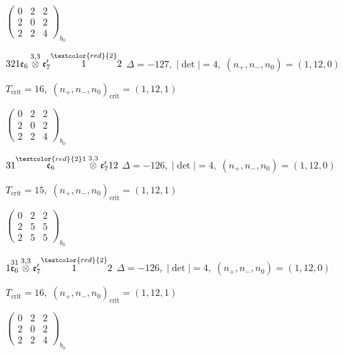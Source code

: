 \documentclass[10pt]{article}
\begin{document}
\hspace{2em}$\left(\begin{smallmatrix}0 & 2 & 2 \\ 2 & 0 & 2 \\ 2 & 2 & 4\end{smallmatrix}\right)_{\!b_0}$

\smallskip

$321\mathfrak{e}_6\overset{3,3}{\otimes}\mathfrak{e}_7'\overset{\textcolor{red}{2}}{1}2$ \quad $\Delta=-127,\; |\det|=4,\; (n_+,n_-,n_0)=(1,12,0)$

\hspace{1em}$T_{\text{crit}}=16,\; (n_+,n_-,n_0)_{\text{crit}}=(1,12,1)$

\hspace{2em}$\left(\begin{smallmatrix}0 & 2 & 2 \\ 2 & 0 & 2 \\ 2 & 2 & 4\end{smallmatrix}\right)_{\!b_0}$

\smallskip

$31\overset{\textcolor{red}{2}1}{\mathfrak{e}_6}\overset{3,3}{\otimes}\mathfrak{e}_7'12$ \quad $\Delta=-126,\; |\det|=4,\; (n_+,n_-,n_0)=(1,12,0)$

\hspace{1em}$T_{\text{crit}}=15,\; (n_+,n_-,n_0)_{\text{crit}}=(1,12,1)$

\hspace{2em}$\left(\begin{smallmatrix}0 & 2 & 2 \\ 2 & 5 & 5 \\ 2 & 5 & 5\end{smallmatrix}\right)_{\!b_0}$

$1\overset{31}{\mathfrak{e}_6}\overset{3,3}{\otimes}\mathfrak{e}_7'\overset{\textcolor{red}{2}}{1}2$ \quad $\Delta=-126,\; |\det|=4,\; (n_+,n_-,n_0)=(1,12,0)$

\hspace{1em}$T_{\text{crit}}=16,\; (n_+,n_-,n_0)_{\text{crit}}=(1,12,1)$

\hspace{2em}$\left(\begin{smallmatrix}0 & 2 & 2 \\ 2 & 0 & 2 \\ 2 & 2 & 4\end{smallmatrix}\right)_{\!b_0}$
\end{document}

